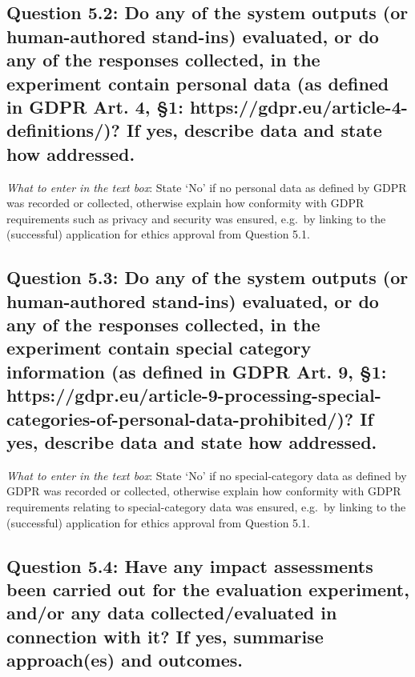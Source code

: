 \documentclass[11pt,a4paper]{article}
\begin{document}
\vspace{-.3cm}
\subsection*{Question 5.2: Do any of the system outputs (or human-authored stand-ins) evaluated, or do any of the responses collected, in the experiment contain personal data (as defined in GDPR Art. 4, §1: https://gdpr.eu/article-4-definitions/)? If yes, describe data and state how addressed.}
\vspace{-.1cm}

\vspace{.3cm}
\noindent\textit{What to enter in the text box}: State `No' if no personal data as defined by GDPR was recorded or collected, otherwise explain how conformity with GDPR requirements such as privacy and security was ensured, e.g.\ by linking to the (successful) application for ethics approval from Question 5.1.

\vspace{-.3cm}
\subsection*{Question 5.3: Do any of the system outputs (or human-authored stand-ins) evaluated, or do any of the responses collected, in the experiment contain special category information (as defined in GDPR Art. 9, §1: https://gdpr.eu/article-9-processing-special-categories-of-personal-data-prohibited/)? If yes, describe data and state how addressed.}
\vspace{-.1cm}

\vspace{.3cm}
\noindent\textit{What to enter in the text box}: State `No' if no special-category data as defined by GDPR was recorded or collected, otherwise explain how conformity with GDPR requirements relating to special-category data was ensured, e.g.\ by linking to the (successful) application for ethics approval from Question 5.1.

\vspace{-.3cm}
\subsection*{Question 5.4:  Have any impact assessments been carried out for the evaluation experiment, and/or any data collected/evaluated in connection with it? If yes, summarise approach(es) and outcomes.}
\end{document}
